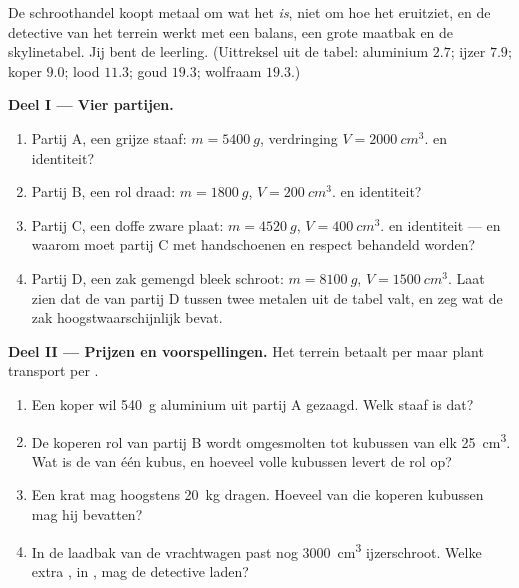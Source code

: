 \begin{problem}\label{pb:g7:volume-mass-density:1}
De schroothandel koopt metaal om wat het \emph{is}, niet om hoe het
eruitziet, en de detective van het terrein werkt met een balans, een
grote maatbak en de skylinetabel. Jij bent de leerling. (Uittreksel
uit de tabel: aluminium $2.7$; ijzer $7.9$; koper $9.0$; lood $11.3$;
goud $19.3$; wolfraam $19.3$.)

\medskip\noindent\textbf{Deel I --- Vier partijen.}
\begin{enumerate}
  \item Partij A, een grijze staaf: $m = \qty{5400}{g}$, verdringing
        $V = \qty{2000}{cm^3}$.  en identiteit?
  \item Partij B, een rol draad: $m = \qty{1800}{g}$,
        $V = \qty{200}{cm^3}$.  en identiteit?
  \item Partij C, een doffe zware plaat: $m = \qty{4520}{g}$,
        $V = \qty{400}{cm^3}$.  en identiteit --- en waarom
        moet partij C met handschoenen en respect behandeld worden?
  \item Partij D, een zak gemengd bleek schroot: $m = \qty{8100}{g}$,
        $V = \qty{1500}{cm^3}$. Laat zien dat de  van partij
        D tussen twee metalen uit de tabel valt, en zeg wat de zak
        hoogstwaarschijnlijk bevat.
\end{enumerate}

\medskip\noindent\textbf{Deel II --- Prijzen en voorspellingen.}
Het terrein betaalt per  maar plant transport per .
\begin{enumerate}[resume]
  \item Een koper wil \qty{540}{g} aluminium uit partij A gezaagd.
        Welk  staaf is dat?
  \item De koperen rol van partij B wordt omgesmolten tot kubussen
        van elk \qty{25}{cm^3}. Wat is de  van één kubus, en
        hoeveel volle kubussen levert de rol op?
  \item Een krat mag hoogstens \qty{20}{kg} dragen. Hoeveel van die
        koperen kubussen mag hij bevatten?
  \item In de laadbak van de vrachtwagen past nog \qty{3000}{cm^3}
        ijzerschroot. Welke extra , in , mag de
        detective laden?
\end{enumerate}


\end{problem}
